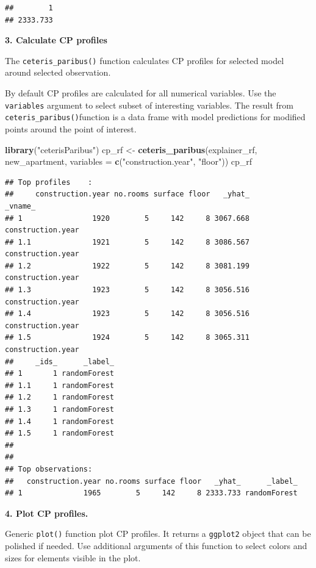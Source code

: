 \documentclass[]{book}
\newenvironment{Shaded}{\begin{snugshade}}{\end{snugshade}}
\newcommand{\DataTypeTok}[1]{\textcolor[rgb]{0.13,0.29,0.53}{#1}}
\newcommand{\KeywordTok}[1]{\textcolor[rgb]{0.13,0.29,0.53}{\textbf{#1}}}
\newcommand{\NormalTok}[1]{#1}
\newcommand{\StringTok}[1]{\textcolor[rgb]{0.31,0.60,0.02}{#1}}
\theoremstyle{definition}
\theoremstyle{definition}
\theoremstyle{definition}
\theoremstyle{remark}
\begin{document}
\begin{verbatim}
##        1 
## 2333.733
\end{verbatim}

\textbf{3. Calculate CP profiles}

The \texttt{ceteris\_paribus()} function calculates CP profiles for
selected model around selected observation.

By default CP profiles are calculated for all numerical variables. Use
the \texttt{variables} argument to select subset of interesting
variables. The result from \texttt{ceteris\_paribus()}function is a data
frame with model predictions for modified points around the point of
interest.

\begin{Shaded}
\begin{Highlighting}[]
\KeywordTok{library}\NormalTok{(}\StringTok{"ceterisParibus"}\NormalTok{)}
\NormalTok{cp_rf <-}\StringTok{ }\KeywordTok{ceteris_paribus}\NormalTok{(explainer_rf, new_apartment, }
                            \DataTypeTok{variables =} \KeywordTok{c}\NormalTok{(}\StringTok{"construction.year"}\NormalTok{, }\StringTok{"floor"}\NormalTok{))}
\NormalTok{cp_rf}
\end{Highlighting}
\end{Shaded}

\begin{verbatim}
## Top profiles    : 
##     construction.year no.rooms surface floor   _yhat_           _vname_
## 1                1920        5     142     8 3067.668 construction.year
## 1.1              1921        5     142     8 3086.567 construction.year
## 1.2              1922        5     142     8 3081.199 construction.year
## 1.3              1923        5     142     8 3056.516 construction.year
## 1.4              1923        5     142     8 3056.516 construction.year
## 1.5              1924        5     142     8 3065.311 construction.year
##     _ids_      _label_
## 1       1 randomForest
## 1.1     1 randomForest
## 1.2     1 randomForest
## 1.3     1 randomForest
## 1.4     1 randomForest
## 1.5     1 randomForest
## 
## 
## Top observations:
##   construction.year no.rooms surface floor   _yhat_      _label_
## 1              1965        5     142     8 2333.733 randomForest
\end{verbatim}

\textbf{4. Plot CP profiles.}

Generic \texttt{plot()} function plot CP profiles. It returns a
\texttt{ggplot2} object that can be polished if needed. Use additional
arguments of this function to select colors and sizes for elements
visible in the plot.
\end{document}
